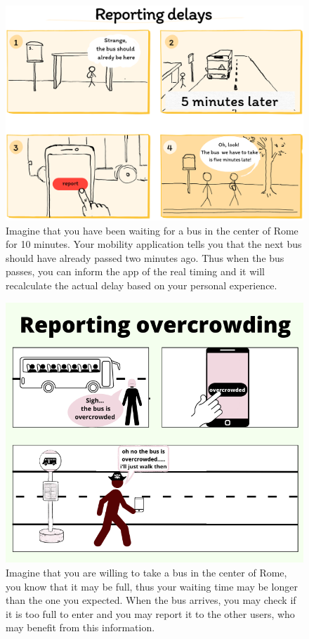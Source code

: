 \documentclass[a4paper, 11pt]{report}
\begin{document}
\begin{figure}[H]
	\centering
	\includegraphics [width=.5\textwidth]{img/storyboards/storyboard_reporting_delays.png}%
	\caption{Imagine that you have been waiting
		for a bus in the center of Rome for 10 minutes. Your mobility application tells you
		that the next bus should have already passed two minutes ago.
		Thus when the bus passes, you can inform the app of the real timing and it will recalculate the actual
		delay based on your personal experience.}\label{fig:b}
\end{figure}



\begin{figure}[H]
	\centering
	\includegraphics[width=.5\textwidth]{img/storyboards/storyboard_overcrowding.png}
	\caption{Imagine that you are willing to take a bus in the center of Rome,
		you know that it may be full, thus your waiting time may be longer than the one you expected. When the bus arrives,
		you may check if it is too full to enter and you may report it to the other users, who may benefit from this information.}\label{fig:c}
\end{figure}
\end{document}
